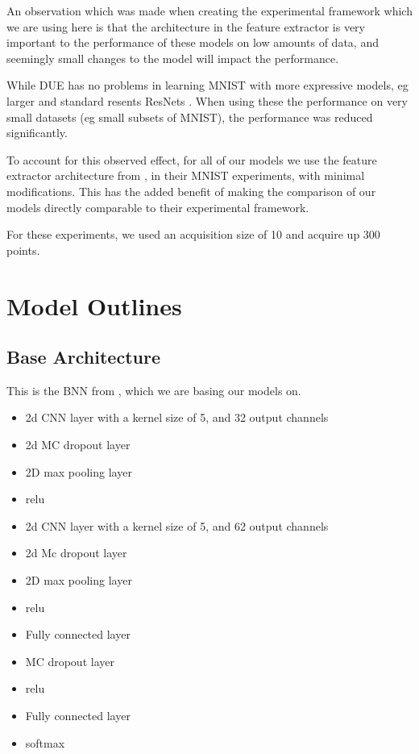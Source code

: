 \documentclass[12pt, a4paper]{report}
\theoremstyle{definition}
\theoremstyle{definition}
\theoremstyle{definition}
\begin{document}
An observation which was made when creating the experimental framework which we are using here is that the architecture in the feature extractor is very important to the performance of these models on low amounts of data, and seemingly small changes to the model will impact the performance.

While DUE has no problems in learning MNIST with more expressive models, eg larger and standard resents ResNets \cite{resnet}. When using these the performance on very small datasets (eg small subsets of MNIST), the performance was reduced significantly.


To account for this observed effect, for all of our models we use the feature extractor architecture from \cite{kirsch2019batchbald}, in their MNIST experiments, with minimal modifications. This has the added benefit of making the comparison of our models directly comparable to their experimental framework.

For these experiments, we used an acquisition size of 10 and acquire up 300 points.

\section{Model Outlines}


\subsection{Base Architecture}

This is the BNN from \cite{kirsch2019batchbald}, which we are basing our models on.


\begin{itemize}
    \item 2d CNN layer with a kernel size of 5, and 32 output channels
    \item 2d MC dropout layer
    \item 2D max pooling layer
    \item relu
    \item 2d CNN layer with a kernel size of 5, and 62 output channels
    \item 2d Mc dropout layer
    \item 2D max pooling layer
    \item relu
    \item Fully connected layer
    \item MC dropout layer
    \item relu
    \item Fully connected layer
    \item softmax
\end{itemize}
\end{document}
